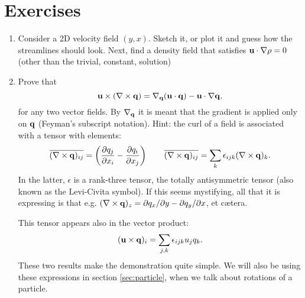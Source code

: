 \section{Exercises}
\label{sec:Euler_exercises}

\begin{enumerate}
	
\item \label{ex:2D_dens_for_u} Consider
a 2D velocity field $(y,x)$. Sketch it, or plot it and
guess how the streamlines should look. Next, find
a density field that satisfies $\mathbf{u} \cdot \nabla \rho = 0$
(other than the trivial, constant, solution)
	
\item \label{ex:vector_identity} Prove that
\[
\mathbf{u} \times ( \nabla\times \mathbf{q}) =
\nabla_{\mathbf{q}} (\mathbf{u}\cdot\mathbf{q}) - \mathbf{u} \cdot \nabla \mathbf{q} ,
\]
for any two vector fields. By $\nabla_{\mathbf{q}} $ it is meant that the
gradient is applied only on $\mathbf{q}$ (Feyman's subscript notation).
Hint: the curl of a field is associated with a tensor with elements:
\[
  \overline{( \nabla\times\mathbf{q} )_{ij}} =
  \left(
    \frac{\partial q_j}{\partial x_i} -
    \frac{\partial q_i}{\partial x_j}
  \right) \qquad
  \overline{( \nabla\times\mathbf{q} )_{ij}} =
  \sum_k \epsilon_{ijk}  ( \nabla\times\mathbf{q} )_k .
\]
In the latter, $\epsilon$ is a rank-three tensor, the totally
antisymmetric tensor (also known as the Levi-Civita symbol).  If this
seems mystifying, all that it is expressing is that e.g.  $
(\nabla\times\mathbf{q})_z= \partial q_x /\partial y - \partial q_y
/\partial x$, et c\ae tera.

This tensor appears also in the vector product:
\[
(\mathbf{u}\times\mathbf{q})_i= \sum_{j,k} \epsilon_{ijk} u_j q_k .
\]
These two results make the demonstration quite simple. We will
also be using these expressions in section \ref{sec:particle}, when
we talk about rotations of a particle.

\end{enumerate}
